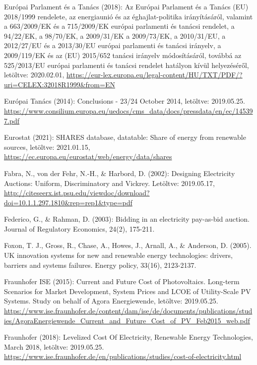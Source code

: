 \documentclass[twoside, magyar, showtrims]{corvinusphd}
\theoremstyle{plain}
\theoremstyle{remark}
\theoremstyle{definition}
\begin{document}
\begin{thebibliography}{99}
Európai Parlament és a Tanács (2018): Az Európai Parlament és a Tanács (EU) 2018/1999 rendelete, az energiaunió és az éghajlat-politika irányításáról, valamint a 663/2009/EK és a 715/2009/EK európai parlamenti és tanácsi rendelet, a 94/22/EK, a 98/70/EK, a 2009/31/EK a 2009/73/EK, a 2010/31/EU, a 2012/27/EU és a 2013/30/EU európai parlamenti és tanácsi irányelv, a 2009/119/EK és az (EU) 2015/652 tanácsi irányelv módosításáról, továbbá az 525/2013/EU európai parlamenti és tanácsi rendelet hatályon kívül helyezéséről,
letöltve: 2020.02.01, 
\url{https://eur-lex.europa.eu/legal-content/HU/TXT/PDF/?uri=CELEX:32018R1999&from=EN} 

Európai Tanács (2014): Conclusions - 23/24 October 2014, letöltve: 2019.05.25.
\url{https://www.consilium.europa.eu/uedocs/cms\_data/docs/pressdata/en/ec/145397.pdf}

Eurostat (2021): SHARES database, datatable: Share of energy from renewable sources, letöltve: 2021.01.15,
\url{https://ec.europa.eu/eurostat/web/energy/data/shares}

Fabra, N., von der Fehr, N.-H., \& Harbord, D. (2002): Designing Electricity Auctions: Uniform, Discriminatory and Vickrey. Letöltve: 2019.05.17,
\url{http://citeseerx.ist.psu.edu/viewdoc/download?doi=10.1.1.297.1810\&rep=rep1\&type=pdf}

Federico, G., \& Rahman, D. (2003): Bidding in an electricity pay-as-bid auction. Journal of Regulatory Economics, 24(2), 175-211.

Foxon, T. J., Gross, R., Chase, A., Howes, J., Arnall, A., \& Anderson, D. (2005). UK innovation systems for new and renewable energy technologies: drivers, barriers and systems failures. Energy policy, 33(16), 2123-2137.

Fraunhofer ISE (2015): Current and Future Cost of Photovoltaics. Long-term Scenarios for Market Development, System Prices and LCOE of Utility-Scale PV Systems. Study on behalf of Agora Energiewende, letöltve: 2019.05.25.
\url{https://www.ise.fraunhofer.de/content/dam/ise/de/documents/publications/studies/AgoraEnergiewende\_Current\_and\_Future\_Cost\_of\_PV\_Feb2015\_web.pdf}

Fraunhofer (2018): Levelized Cost Of Electricity, Renewable Energy Technologies, March 2018, letöltve: 2019.05.25.
\url{https://www.ise.fraunhofer.de/en/publications/studies/cost-of-electricity.html}


\end{thebibliography}
\end{document}
